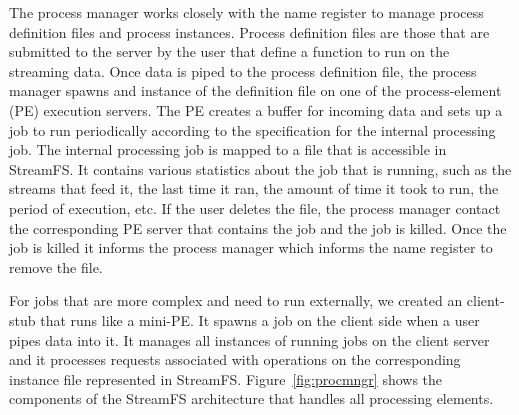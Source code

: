 The process manager works closely with the name register to manage process definition files and process instances.  Process definition files
are those that are submitted to the server by the user that define a function to run on the streaming data.  Once data is piped to the process
definition file, the process manager spawns and instance of the definition file on one of the process-element (PE) execution servers.  The PE
creates a buffer for incoming data and sets up a job to run periodically according to the specification for the internal processing job.
The internal processing job is mapped to a file that is accessible in StreamFS.  It contains various statistics about the job that is running, such
as the streams that feed it, the last time it ran, the amount of time it took to run, the period of execution, etc.
If the user deletes the file, the process manager contact the corresponding PE server that contains the job and the job is killed.  Once the job
is killed it informs the process manager which informs the name register to remove the file.

For jobs that are more complex and need to run externally, we created an client-stub that runs like a mini-PE.  It spawns a job on the client
side when a user pipes data into it.  It manages all instances of running jobs on the client server and it processes requests associated with
operations on the corresponding instance file represented in StreamFS.  Figure~\ref{fig:procmngr} shows the components of the StreamFS architecture
that handles all processing elements.














